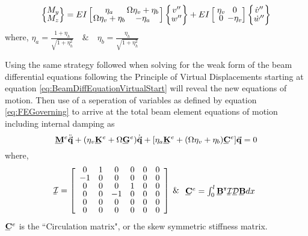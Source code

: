 \begin{equation}\label{key}
\def\cs{4em}
\def\cd{1.5em}
\left\{\def\arraystretch{.8}\begin{array}{@{}c@{}}
M_y\\
M_z
\end{array}\right\} = E I\left[\def\arraystretch{.8}\arraycolsep=0em\begin{array}{@{}cc@{}}
\makebox[\cs]{$\eta_a$}&\makebox[\cs]{$\Omega \eta_v+\eta_b$}\\
\Omega \eta_v+\eta_b&-\eta_a
\end{array}\right]\left\{\arraycolsep=0pt\def\arraystretch{.8}\begin{array}{@{}c@{}}
v''\\
w''
\end{array}\right\}+EI\left[\arraycolsep=0pt\def\arraystretch{.8}\begin{array}{@{}cc@{}}
\makebox[\cd]{$\eta_v$}&\makebox[\cd]{0}\\
0&-\eta_v
\end{array}\right]\left\{\arraycolsep=0pt\def\arraystretch{.8}\begin{array}{@{}c@{}}
\dot{v}''\\
\dot{w}''
\end{array}\right\}
\end{equation}
where, $ \eta_a=\frac{1+\eta_h}{\sqrt{1+\eta_h^2}}\quad \& \quad \eta_b=\frac{\eta_h}{\sqrt{1+\eta_h^2}} $\par 
Using the same strategy followed when solving for the weak form of the beam differential equations following the Principle of Virtual Displacements starting at equation \eqref{eq:BeamDiffEquationVirtualStart} will reveal the new equations of motion. Then use of a seperation of variables as defined by equation \eqref{eq:FEGoverning} to arrive at the total beam element equations of motion including internal damping as
\begin{equation}\label{eq:TotalBeamFiniteElementEquationofMotion}
\bunderline{\mathbf{M}}^e\ddot{\vec{\mathbf{q}}}+(\eta_v\bunderline{\mathbf{K}}^e+\Omega\bunderline{\mathbf{G}}^e)\dot{\vec{\mathbf{q}}}+[\eta_a\bunderline{\mathbf{K}}^e+(\Omega\eta_v+\eta_b)\bunderline{\mathbf{C}}^e]\vec{\mathbf{q}}=0
\end{equation}
where,
\begin{equation}\label{key}
\bunderline{\mathcal{I}}=\left[\def\arraystretch{.8}\begin{array}{cccccc}
0&1&0&0&0&0\\
-1&0&0&0&0&0\\
0&0&0&1&0&0\\
0&0&-1&0&0&0\\
0&0&0&0&0&0\\
0&0&0&0&0&0
\end{array}\right]\:\&\:\begin{array}{c}
\bunderline{\mathbf{C}}^e=\int_0^l\bunderline{\mathbf{B}}^\T\bunderline{\mathcal{I}}\bunderline{\mathcal{D}}\bunderline{\mathbf{B}}dx
\end{array}
\end{equation}
$ \bunderline{\mathbf{C}}^e $ is the ``Circulation matrix", or the skew symmetric stiffness matrix.
